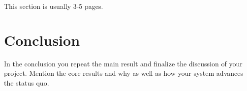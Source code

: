 \documentclass[a4paper,11pt,oneside]{report}
\begin{document}
This section is usually 3-5 pages.


\chapter{Conclusion}

In the conclusion you repeat the main result and finalize the discussion of
your project. Mention the core results and why as well as how your system
advances the status quo.

\cleardoublepage
{}
{}
\printbibliography
\end{document}
